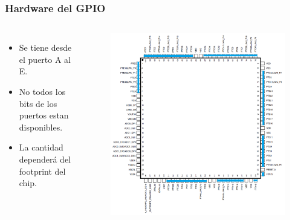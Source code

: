 \documentclass[10.5pt,scale=1.0,t,aspectratio=169,hyperref={pdfpagelabels=false}]{beamer}
\begin{document}
\begin{frame}
	\frametitle{Hardware del GPIO}
	\begin{columns}
		\begin{itemize}
			\item Se tiene desde el puerto A al E.
			\item No todos los bits de los puertos estan disponibles.
			\item La cantidad dependerá del footprint del chip. 
		\end{itemize}
		
		\begin{figure}
			\centering
			\includegraphics[scale=0.35]{04_GPIOPorts}
		\end{figure}
	\end{columns}
\end{frame}
\end{document}
